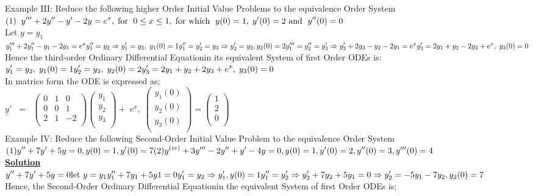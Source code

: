 \documentclass[a4paper 11pt]{article}
\newcommand{\bt}[1]{\textbf{#1}}
\newcommand{\NI}{\noindent}
\newcommand{\IVP}{Initial Value Problem }
\newcommand{\IVPs}{Initial Value Problems }
\newcommand{\dsp}{\displaystyle}
\newcommand{\be}{\(\dsp} %
\newcommand{\ee}{\)\\[0.3cm]} %
\newcommand{\sol}{\bt{\NI\underline{Solution}}\\[0.2cm]}
\newcommand{\sprime}{'}
\newcommand{\dprime}{''}
\newcommand{\tprime}{'''}
\newcommand{\imp}{\Rightarrow}
\renewcommand{\sp}{\\[0.3cm]}
\newcommand{\spn}[1]{\\[#1]}
\newcommand{\ODE}{Ordinary Differential Equation}
\newcommand{\nprim}[1]{^{#1}}
\newcommand{\yn}[1]{y_{#1}}
\newcommand{\ex}[1]{\NI Example #1:}
\begin{document}
\ex{III} Reduce the following higher Order \IVPs to the equivalence Order System\sp
\be
(1) \; \; y\tprime + 2y\dprime - y\sprime - 2y = e^x, \; \text{for } \; 0 \leq x \leq 1, \; \text{for which } \; y(0) = 1, \; y\sprime(0) = 2 \text{ and } \; y\dprime(0) = 0 \sp
\ee
Let \(y = y_1\)\sp
\be
\yn{1}\tprime + 2\yn{1}\dprime - \yn{1} - 2y_1 = e^x \sp
y_1\dprime = y_2 \imp y_1\sprime = y_2, \; y_1(0) = 1\sp
y_1\dprime = y_2\sprime = y_3 \imp y_2\sprime = y_2, y_2(0) = 2\sp
y_1\tprime = y_2\dprime = y_3\sprime\sp
\imp y_3\sprime + 2y_3 - y_2 - 2y_1 = e^x \sp
y_3\sprime = 2y_1 + y_2 - 2y_3 + e^x, \; y_3(0) = 0
\ee
Hence the third-order \ODE in its equivalent System of first Order ODEs is:\sp
\be 
y_1\sprime = y_2, \; y_1(0) = 1 \sp
y_2\sprime = y_3, \; y_2(0) = 2
y_3\sprime = 2y_1 + y_2 + 2y_3 + e^x , \; y_3(0) = 0
\ee
In matrice form the ODE is expressed as;\sp
\(\displaystyle \underline{y}\sprime \; \; = \; \;
\begin{pmatrix}
	0	&	1	&	0\\
	0	&	0	&	1\\
	2	&	1	&	-2\\
\end{pmatrix}
\begin{pmatrix}
	y_1 \\
	y_2 \\
	y_3 \\
\end{pmatrix}
+ \; e^x, \;
\begin{pmatrix}
	y_1(0) \\
	y_2(0) \\
	y_3(0) \\
\end{pmatrix} = 
\begin{pmatrix}
	1 \\ 2 \\ 0 \\
\end{pmatrix}
\)\sp
\newpage
\ex{IV} Reduce the following Second-Order \IVP to the equivalence Order System \sp
\be
(1) y\dprime + 7y\sprime + 5y = 0 , y(0) = 1 , y\sprime(0) = 7 \sp
(2) y\nprim{(iv)} + 3y\tprime - 2y\dprime + y\sprime - 4y = 0 , y(0) = 1, y\sprime(0) = 2 , y\dprime(0) = 3 , y\tprime(0) = 4
\ee
\sol
\be
y\dprime + 7y\sprime + 5y = 0 \sp
\text{let } y = y_1\sp
y_1\dprime + 7y_1 + 5y1 = 0\sp
y_1\sprime = y_2 \imp y_1\sprime , y(0) = 1 \sp
y_1\dprime = y_2\sprime \sp
\imp y_2\sprime + 7y_2 + 5y_1 = 0\sp
\imp y_2\sprime = -5y_1 - 7y_2 , y_2(0) = 7 \spn{0.01cm}
\ee
Hence, the Second-Order \ODE in the equivalent System of first Order ODEs is;\sp
\end{document}
